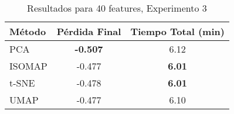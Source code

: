 
\begin{table}[h]
\centering
\begin{tabular}{lcc}
\toprule
\textbf{Método} & \textbf{Pérdida Final} & \textbf{Tiempo Total (min)} \\
\midrule
PCA & \textbf{-0.507} & 6.12 \\
ISOMAP & -0.477 & \textbf{6.01} \\
t-SNE & -0.478 & \textbf{6.01} \\
UMAP & -0.477 & 6.10 \\
\bottomrule
\end{tabular}
\caption{Resultados para 40 features, Experimento 3}
\label{tab:results_40feat_exp3}
\end{table}
